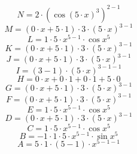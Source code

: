 \documentclass[12pt]{article}
\begin{document}
\begin{equation}
	N = 
2\cdot \left( \cos {\left( 5\cdot x\right) ^{3}}\right) ^{2 - 1}
\end{equation}
\begin{equation}
	M = 
\left( 0\cdot x + 5\cdot 1\right) \cdot 3\cdot \left( 5\cdot x\right) ^{3 - 1}
\end{equation}
\begin{equation}
	L = 
1\cdot 5\cdot x^{5 - 1}\cdot \cos {x^{5}}
\end{equation}
\begin{equation}
	K = 
\left( 0\cdot x + 5\cdot 1\right) \cdot 3\cdot \left( 5\cdot x\right) ^{3 - 1}
\end{equation}
\begin{equation}
	J = 
\left( 0\cdot x + 5\cdot 1\right) \cdot 3\cdot \left( 5\cdot x\right) ^{3 - 1}
\end{equation}
\begin{equation}
	I = 
\left( 3 - 1\right) \cdot \left( 5\cdot x\right) ^{3 - 1 - 1}
\end{equation}
\begin{equation}
	H = 
0\cdot x + 0\cdot 1 + 0\cdot 1 + 5\cdot 0
\end{equation}
\begin{equation}
	G = 
\left( 0\cdot x + 5\cdot 1\right) \cdot 3\cdot \left( 5\cdot x\right) ^{3 - 1}
\end{equation}
\begin{equation}
	F = 
\left( 0\cdot x + 5\cdot 1\right) \cdot 3\cdot \left( 5\cdot x\right) ^{3 - 1}
\end{equation}
\begin{equation}
	E = 
1\cdot 5\cdot x^{5 - 1}\cdot \cos {x^{5}}
\end{equation}
\begin{equation}
	D = 
\left( 0\cdot x + 5\cdot 1\right) \cdot 3\cdot \left( 5\cdot x\right) ^{3 - 1}
\end{equation}
\begin{equation}
	C = 
1\cdot 5\cdot x^{5 - 1}\cdot \cos {x^{5}}
\end{equation}
\begin{equation}
	B = 
-1\cdot 1\cdot 5\cdot x^{5 - 1}\cdot \sin {x^{5}}
\end{equation}
\begin{equation}
	A = 
5\cdot 1\cdot \left( 5 - 1\right) \cdot x^{5 - 1 - 1}
\end{equation}
\end{document}
